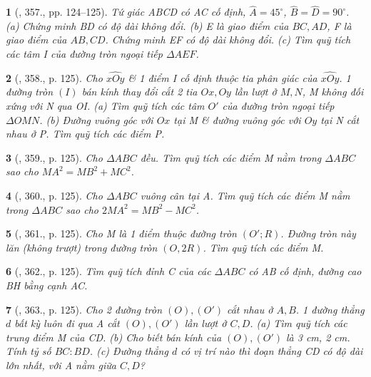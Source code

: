 \documentclass{article}
\newtheorem{baitoan}{}
\begin{document}
\begin{baitoan}[\cite{Binh_Toan_9_tap_2}, 357., pp. 124--125]
	Tứ giác ABCD có AC cố định, $\widehat{A} = 45^\circ$, $\widehat{B} = \widehat{D} = 90^\circ$. (a) Chứng minh BD có độ dài không đổi. (b) E là giao điểm của $BC,AD$, F là giao điểm của $AB,CD$. Chứng minh EF có độ dài không đổi. (c) Tìm quỹ tích các tâm I của đường tròn ngoại tiếp $\Delta AEF$.
\end{baitoan}

\begin{baitoan}[\cite{Binh_Toan_9_tap_2}, 358., p. 125]
	Cho $\widehat{xOy}$ \& 1 điểm I cố định thuộc tia phân giác của $\widehat{xOy}$. 1 đường tròn $(I)$ bán kính thay đổi cắt 2 tia $Ox,Oy$ lần lượt ở $M,N$, M không đối xứng với N qua OI. (a) Tìm quỹ tích các tâm $O'$ của đường tròn ngoại tiếp $\Delta OMN$. (b) Đường vuông góc với $Ox$ tại M \& đường vuông góc với $Oy$ tại N cắt nhau ở P. Tìm quỹ tích các điểm P.
\end{baitoan}

\begin{baitoan}[\cite{Binh_Toan_9_tap_2}, 359., p. 125]
	Cho $\Delta ABC$ đều. Tìm quỹ tích các điểm M nằm trong $\Delta ABC$ sao cho $MA^2 = MB^2 + MC^2$.
\end{baitoan}

\begin{baitoan}[\cite{Binh_Toan_9_tap_2}, 360., p. 125]
	Cho $\Delta ABC$ vuông cân tại A. Tìm quỹ tích các điểm M nằm trong $\Delta ABC$ sao cho $2MA^2 = MB^2 - MC^2$.
\end{baitoan}

\begin{baitoan}[\cite{Binh_Toan_9_tap_2}, 361., p. 125]
	Cho M là 1 điểm thuộc đường tròn $(O';R)$. Đường tròn này lăn (không trượt) trong đường tròn $(O,2R)$. Tìm quỹ tích các điểm M.
\end{baitoan}

\begin{baitoan}[\cite{Binh_Toan_9_tap_2}, 362., p. 125]
	Tìm quỹ tích đỉnh C của các $\Delta ABC$ có AB cố định, đường cao BH bằng cạnh AC.
\end{baitoan}

\begin{baitoan}[\cite{Binh_Toan_9_tap_2}, 363., p. 125]
	Cho 2 đường tròn $(O),(O')$ cắt nhau ở $A,B$. 1 đường thẳng $d$ bất kỳ luôn đi qua A cắt $(O),(O')$ lần lượt ở $C,D$. (a) Tìm quỹ tích các trung điểm M của CD. (b) Cho biết bán kính của $(O),(O')$ là {\rm3 cm, 2 cm}. Tính tỷ số $BC:BD$. (c) Đường thẳng $d$ có vị trí nào thì đoạn thẳng CD có độ dài lớn nhất, với A nằm giữa $C,D$?
\end{baitoan}
\end{document}
